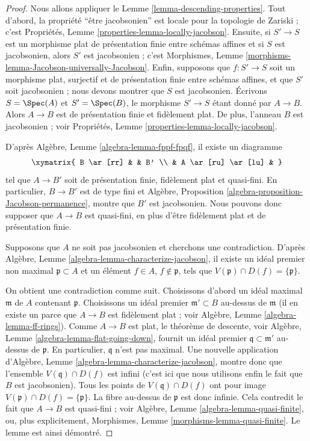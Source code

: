 \begin{proof}
Nous allons appliquer le Lemme \ref{lemma-descending-properties}.
Tout d'abord, la propriété ``être jacobsonien'' est locale pour la topologie
de Zariski ; c'est Propriétés, Lemme
\ref{properties-lemma-locally-jacobson}. Ensuite, si $S' \to S$ est un
morphisme plat de présentation finie entre schémas affines et si $S$ est
jacobsonien, alors $S'$ est jacobsonien ; c'est Morphismes, Lemme
\ref{morphisms-lemma-Jacobson-universally-Jacobson}. Enfin, supposons que
$f : S' \to S$ soit un morphisme plat, surjectif et de présentation finie
entre schémas affines, et que $S'$ soit jacobsonien ; nous devons montrer
que $S$ est jacobsonien. Écrivons $S = \Spec(A)$ et $S' = \Spec(B)$, le
morphisme $S' \to S$ étant donné par $A \to B$. Alors $A \to B$ est de
présentation finie et fidèlement plat. De plus, l'anneau $B$ est jacobsonien ;
voir Propriétés, Lemme \ref{properties-lemma-locally-jacobson}.

\medskip\noindent
D'après Algèbre, Lemme \ref{algebra-lemma-fppf-fpqf}, il existe un diagramme
$$
\xymatrix{
B \ar[rr] & & B' \\
& A \ar[ru] \ar[lu] &
}
$$
tel que $A \to B'$ soit de présentation finie, fidèlement plat et quasi-fini.
En particulier, $B \to B'$ est de type fini et Algèbre, Proposition
\ref{algebra-proposition-Jacobson-permanence}, montre que $B'$ est
jacobsonien. Nous pouvons donc supposer que $A \to B$ est quasi-fini, en plus
d'être fidèlement plat et de présentation finie.

\medskip\noindent
Supposons que $A$ ne soit pas jacobsonien et cherchons une contradiction.
D'après Algèbre, Lemme \ref{algebra-lemma-characterize-jacobson}, il existe
un idéal premier non maximal $\mathfrak p \subset A$ et un élément $f \in A$,
$f \not \in \mathfrak p$, tels que
$V(\mathfrak p) \cap D(f) = \{\mathfrak p\}$.

\medskip\noindent
On obtient une contradiction comme suit. Choisissons d'abord un idéal maximal
$\mathfrak m$ de $A$ contenant $\mathfrak p$. Choisissons un idéal premier
$\mathfrak m' \subset B$ au-dessus de $\mathfrak m$ (il en existe un parce
que $A \to B$ est fidèlement plat ; voir Algèbre, Lemme
\ref{algebra-lemma-ff-rings}). Comme $A \to B$ est plat, le théorème de
descente, voir Algèbre, Lemme \ref{algebra-lemma-flat-going-down}, fournit
un idéal premier $\mathfrak q \subset \mathfrak m'$ au-dessus de
$\mathfrak p$. En particulier, $\mathfrak q$ n'est pas maximal. Une nouvelle
application d'Algèbre, Lemme \ref{algebra-lemma-characterize-jacobson},
montre donc que l'ensemble $V(\mathfrak q) \cap D(f)$ est infini (c'est ici
que nous utilisons enfin le fait que $B$ est jacobsonien). Tous les points de
$V(\mathfrak q) \cap D(f)$ ont pour image
$V(\mathfrak p) \cap D(f) = \{\mathfrak p\}$. La fibre au-dessus de
$\mathfrak p$ est donc infinie. Cela contredit le fait que $A \to B$ est
quasi-fini ; voir Algèbre, Lemme \ref{algebra-lemma-quasi-finite}, ou, plus
explicitement, Morphismes, Lemme \ref{morphisms-lemma-quasi-finite}.
Le lemme est ainsi démontré.
\end{proof}

